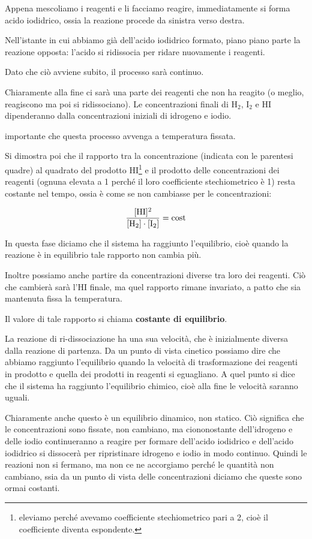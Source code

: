 Appena mescoliamo i reagenti e li facciamo reagire, immediatamente si forma acido iodidrico, ossia la reazione procede da sinistra verso destra.

Nell'istante in cui abbiamo già dell'acido iodidrico formato, piano piano parte la reazione opposta: l'acido si ridissocia per ridare nuovamente i reagenti.

Dato che ciò avviene subito, il processo sarà continuo.

Chiaramente alla fine ci sarà una parte dei reagenti che non ha reagito (o meglio, reagiscono ma poi si ridissociano). Le concentrazioni finali di H$_2$, I$_2$ e HI dipenderanno dalla concentrazioni iniziali di idrogeno e iodio.

\E importante che questa processo avvenga a temperatura fissata.

Si dimostra poi che il rapporto tra la concentrazione (indicata con le parentesi quadre) al quadrato del prodotto HI\footnote{eleviamo perché avevamo coefficiente stechiometrico pari a 2, cioè il coefficiente diventa espondente.} e il prodotto delle concentrazioni dei reagenti (ognuna elevata a 1 perché il loro coefficiente stechiometrico è 1) resta costante nel tempo, ossia è come se non cambiasse per le concentrazioni:

$$\rm \frac{[HI]^2}{[H_2] \cdot [I_2]}=cost$$

In questa fase diciamo che il sistema ha raggiunto l'equilibrio, cioè quando la reazione è in equilibrio tale rapporto non cambia più.

Inoltre possiamo anche partire da concentrazioni diverse tra loro dei reagenti. Ciò che cambierà sarà l'HI finale, ma quel rapporto rimane invariato, a patto che sia mantenuta fissa la temperatura.

Il valore di tale rapporto si chiama \textbf{costante di equilibrio}.

La reazione di ri-dissociazione ha una sua velocità, che è inizialmente diversa dalla reazione di partenza. Da un punto di vista cinetico possiamo dire che abbiamo raggiunto l'equilibrio quando la velocità di trasformazione dei reagenti in prodotto e quella dei prodotti in reagenti si eguagliano. A quel punto si dice che il sistema ha raggiunto l'equilibrio chimico, cioè alla fine le velocità saranno uguali.

Chiaramente anche questo è un equilibrio dinamico, non statico. Ciò significa che le concentrazioni sono fissate, non cambiano, ma ciononostante dell'idrogeno e delle iodio continueranno a reagire per formare dell'acido iodidrico e dell'acido iodidrico si dissocerà per ripristinare idrogeno e iodio in modo continuo. Quindi le reazioni non si fermano, ma non ce ne accorgiamo perché le quantità non cambiano, ssia da un punto di vista delle concentrazioni diciamo che queste sono ormai costanti.

